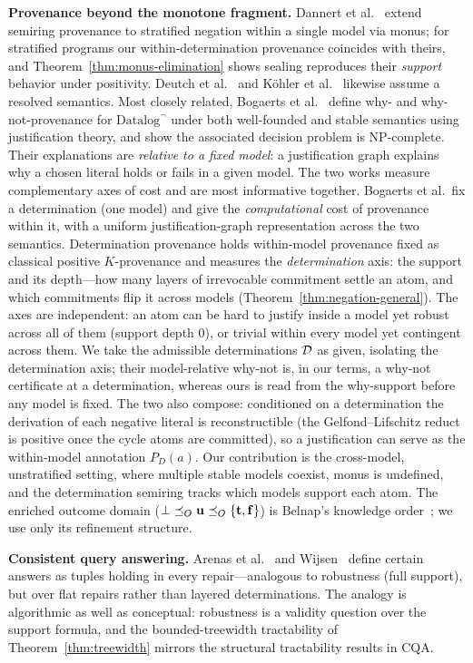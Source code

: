 \smallskip
\noindent\textbf{Provenance beyond the monotone fragment.}
Dannert et al.~\cite{dannert2021semiring} extend semiring provenance to
stratified negation within a single model via monus; for stratified programs
our within-determination provenance coincides with theirs, and
Theorem~\ref{thm:monus-elimination} shows sealing reproduces their
\emph{support} behavior under positivity.
Deutch et al.~\cite{deutch2014circuits} and
K\"ohler et al.~\cite{kohler2012declarative} likewise assume a resolved
semantics. Most closely related, Bogaerts et
al.~\cite{bogaerts2026whynot} define why- and why-not-provenance for
$\mbox{Datalog}^\neg$ under both well-founded and stable semantics using
justification theory, and show the associated decision problem is NP-complete.
Their explanations are \emph{relative to a fixed model}: a justification graph
explains why a chosen literal holds or fails in a given model. The two works
measure complementary axes of cost and are most informative together. Bogaerts
et al.\ fix a determination (one model) and give the \emph{computational} cost
of provenance within it, with a uniform justification-graph representation
across the two semantics. Determination provenance holds within-model
provenance fixed as classical positive $K$-provenance and measures the
\emph{determination} axis: the support and its depth---how many layers of
irrevocable commitment settle an atom, and which commitments flip it across
models (Theorem~\ref{thm:negation-general}). The axes are independent: an atom
can be hard to justify inside a model yet robust across all of them (support
depth $0$), or trivial within every model yet contingent across them. We take
the admissible determinations $\mathcal{D}$ as given, isolating the determination
axis; their model-relative why-not is, in our terms, a why-not certificate at a
determination, whereas ours is read from the why-support before any model is
fixed. The two also compose: conditioned on a determination the derivation of
each negative literal is reconstructible (the Gelfond--Lifschitz reduct is
positive once the cycle atoms are committed), so a justification can serve as
the within-model annotation $P_D(a)$. Our contribution is the cross-model,
unstratified setting, where multiple stable models coexist, monus is undefined,
and the determination semiring tracks which models support each atom. The
enriched outcome domain
($\bot \preceq_O \mathbf{u} \preceq_O \{\mathbf{t},\mathbf{f}\}$) is Belnap's knowledge
order~\cite{belnap1977four}; we use only its refinement structure.

\smallskip
\noindent\textbf{Consistent query answering.}
Arenas et al.~\cite{arenas1999consistent} and Wijsen~\cite{wijsen2019certain}
define certain answers as tuples holding in every repair---analogous to
robustness (full support), but over flat repairs rather than layered
determinations. The analogy is algorithmic as well as conceptual: robustness
is a validity question over the support formula, and the bounded-treewidth
tractability of Theorem~\ref{thm:treewidth} mirrors the structural tractability
results in CQA.

